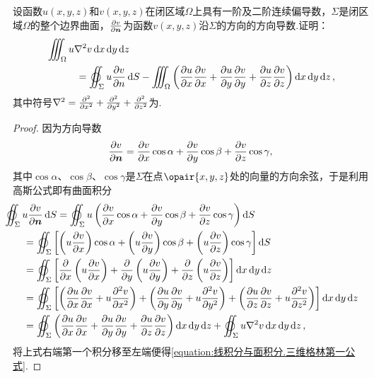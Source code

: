 \begin{example}[三维格林第一公式]
设函数\(u(x,y,z)\)和\(v(x,y,z)\)在闭区域\(\Omega\)上具有一阶及二阶连续偏导数，\(\Sigma\)是闭区域\(\Omega\)的整个边界曲面，\(\pdv{v}{\boldsymbol{n}}\)为函数\(v(x,y,z)\)沿\(\Sigma\)的方向的方向导数.证明：
\begin{equation}\label{equation:线积分与面积分.三维格林第一公式}
\begin{split}
&\iiint_{\Omega} u \laplacian{v} \dd{x}\dd{y}\dd{z} \\
&\hspace{30pt}=\varoiint_{\Sigma} u \pdv{v}{n} \dd{S}
-\iiint_{\Omega} \left(
\pdv{u}{x} \pdv{v}{x}
+\pdv{u}{y} \pdv{v}{y}
+\pdv{u}{z} \pdv{v}{z}
\right) \dd{x}\dd{y}\dd{z},
\end{split}
\end{equation}其中符号\(\laplacian = \pdv[2]{x} + \pdv[2]{y} + \pdv[2]{z}\)为.
\begin{proof}
因为方向导数\[
\pdv{v}{\boldsymbol{n}}
= \pdv{v}{x} \cos\alpha
+ \pdv{v}{y} \cos\beta
+ \pdv{v}{z} \cos\gamma,
\]其中\(\cos\alpha\)、\(\cos\beta\)、\(\cos\gamma\)是\(\Sigma\)在点\(\opair{x,y,z}\)处的向量的方向余弦，于是利用高斯公式即有曲面积分\begin{align*}
&\hspace{-20pt}\varoiint_{\Sigma} u \pdv{v}{\mat{n}} \dd{S}
= \varoiint_{\Sigma} u \left(
\pdv{v}{x} \cos\alpha
+ \pdv{v}{y} \cos\beta
+ \pdv{v}{z} \cos\gamma
\right) \dd{S} \\
&= \varoiint_{\Sigma} \left[
\left( u \pdv{v}{x} \right) \cos\alpha
+ \left( u \pdv{v}{y} \right) \cos\beta
+ \left( u \pdv{v}{z} \right) \cos\gamma
\right] \dd{S} \\
&= \varoiint_{\Sigma} \left[
\pdv{x} \left( u \pdv{v}{x} \right)
+ \pdv{y} \left( u \pdv{v}{y} \right)
+ \pdv{z} \left( u \pdv{v}{z} \right)
\right] \dd{x}\dd{y}\dd{z} \\
&= \varoiint_{\Sigma} \left[
\left( \pdv{u}{x} \pdv{v}{x} + u \pdv[2]{v}{x} \right)
+ \left( \pdv{u}{y} \pdv{v}{y} + u \pdv[2]{v}{y} \right)
+ \left( \pdv{u}{z} \pdv{v}{z} + u \pdv[2]{v}{z} \right)
\right] \dd{x}\dd{y}\dd{z} \\
&= \varoiint_{\Sigma} \left(
\pdv{u}{x} \pdv{v}{x}
+ \pdv{u}{y} \pdv{v}{y}
+ \pdv{u}{z} \pdv{v}{z}
\right) \dd{x}\dd{y}\dd{z}
+ \varoiint_{\Sigma} u \laplacian{v} \dd{x}\dd{y}\dd{z},
\end{align*}将上式右端第一个积分移至左端便得\cref{equation:线积分与面积分.三维格林第一公式}.
\end{proof}
\end{example}
